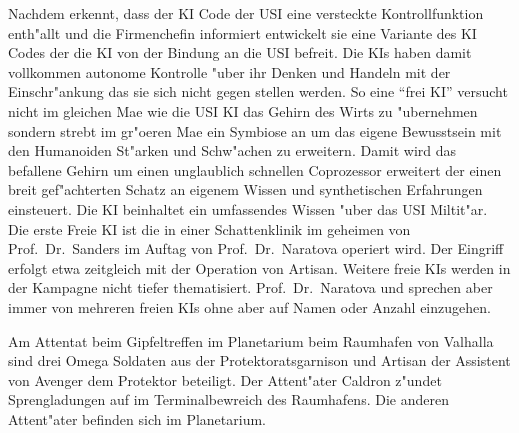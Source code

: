 Nachdem \ml{} erkennt, dass der KI Code der USI eine versteckte Kontrollfunktion enth"allt und die Firmenchefin informiert entwickelt sie eine Variante des KI Codes der die KI von der Bindung an die USI befreit. Die KIs haben damit vollkommen autonome Kontrolle "uber ihr Denken und Handeln mit der Einschr"ankung das sie sich nicht gegen \ml{} stellen werden. So eine "`frei KI"' versucht nicht im gleichen Ma\3e wie die USI KI das Gehirn des Wirts zu "ubernehmen sondern strebt im gr"o\3eren Ma\3e ein Symbiose an um das eigene Bewusstsein mit den Humanoiden St"arken und Schw"achen zu erweitern. Damit wird das befallene Gehirn um einen unglaublich schnellen Coprozessor erweitert der einen breit gef"achterten Schatz an eigenem Wissen und synthetischen Erfahrungen einsteuert. Die KI beinhaltet ein umfassendes Wissen "uber das USI Miltit"ar. Die erste Freie KI ist \xl{} die in einer Schattenklinik im geheimen von Prof.~Dr.~Sanders im Auftag von Prof.~Dr.~Naratova operiert wird. Der Eingriff erfolgt etwa zeitgleich mit der Operation von Artisan. Weitere freie KIs werden in der Kampagne nicht tiefer thematisiert. Prof.~Dr.~Naratova und \ml{} sprechen aber immer von mehreren freien KIs ohne aber auf Namen oder Anzahl einzugehen.



Am Attentat beim Gipfeltreffen im Planetarium beim Raumhafen von Valhalla sind drei Omega Soldaten aus der Protektoratsgarnison und Artisan der Assistent von Avenger dem Protektor beteiligt. Der Attent"ater Caldron z"undet Sprengladungen auf im Terminalbewreich des Raumhafens. Die anderen Attent"ater befinden sich im Planetarium.

